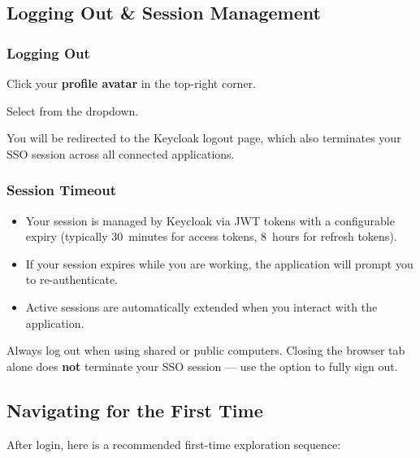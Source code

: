 \subsection{Logging Out \& Session Management}

\subsubsection*{Logging Out}
\begin{ugSteps}
  \item Click your \textbf{profile avatar} in the top-right
        corner.
  \item Select  from the dropdown.
  \item You will be redirected to the Keycloak logout page,
        which also terminates your SSO session across all
        connected applications.
\end{ugSteps}

\subsubsection*{Session Timeout}
\begin{itemize}[leftmargin=18pt]
  \item Your session is managed by Keycloak via JWT tokens
        with a configurable expiry (typically 30~minutes for
        access tokens, 8~hours for refresh tokens).
  \item If your session expires while you are working, the
        application will prompt you to re-authenticate.
  \item Active sessions are automatically extended when you
        interact with the application.
\end{itemize}

\begin{ugWarning}
  Always log out when using shared or public computers. Closing
  the browser tab alone does \textbf{not} terminate your SSO
  session --- use the  option to fully sign out.
\end{ugWarning}

\subsection{Navigating for the First Time}

After login, here is a recommended first-time exploration
sequence:

